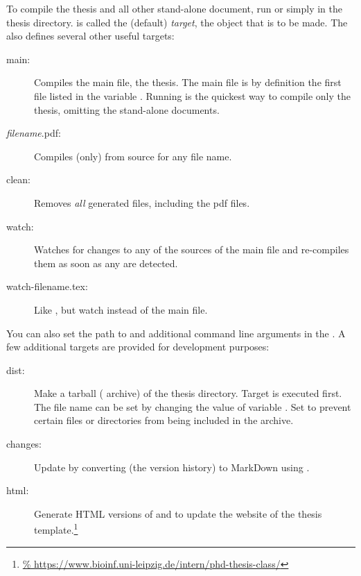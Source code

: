 To compile the thesis and all other stand-alone document, run  or simply  in the thesis directory.  is called
the (default) \emph{target}, \ie the object that is to be made. The
 also defines several other useful targets:
%
\begin{description}
    \item[main:] Compiles the main file, \ie the thesis. The main file is
        by definition the first file listed in the variable
        . Running  is the quickest
        way to compile only the thesis, omitting the stand-alone documents.
    \item[\emph{filename}.pdf:] Compiles (only)  from
        source  for any file name.
    \item[clean:] Removes \emph{all} generated files, including the pdf files.
    \item[watch:] Watches for changes to any of the sources of the main file
        and re-compiles them as soon as any are detected.
    \item[watch-filename.tex:] Like , but watch
         instead of the main file.
\end{description}
%
You can also set the path to  and additional command line
arguments in the . A few additional targets are provided for
development purposes:
%
\begin{description}
    \item[dist:] Make a tarball ( archive) of the thesis
        directory. Target  is executed first. The file name can
        be set by changing the value of variable . Set
         to prevent certain files or directories from
        being included in the archive.
    \item[changes:] Update  by converting
         (\ie the version history) to MarkDown
        using .
    \item[html:] Generate HTML versions of  and
         to update the website of the thesis
        template.\footnote{\url{%
        https://www.bioinf.uni-leipzig.de/intern/phd-thesis-class/}}
\end{description}

